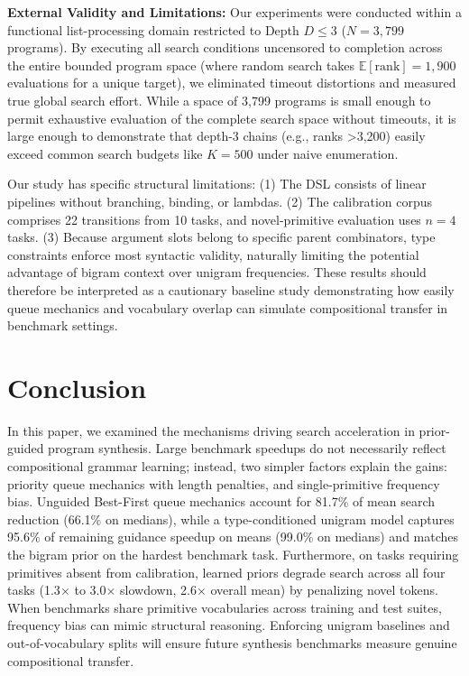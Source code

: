 \documentclass[10pt,twocolumn]{article}
\begin{document}
\textbf{External Validity and Limitations:} Our experiments were conducted within a functional list-processing domain restricted to Depth $D \le 3$ ($N = 3,799$ programs). By executing all search conditions uncensored to completion across the entire bounded program space (where random search takes $\mathbb{E}[\text{rank}] = 1,900$ evaluations for a unique target), we eliminated timeout distortions and measured true global search effort. While a space of 3,799 programs is small enough to permit exhaustive evaluation of the complete search space without timeouts, it is large enough to demonstrate that depth-3 chains (e.g., ranks >3,200) easily exceed common search budgets like $K=500$ under naive enumeration.

Our study has specific structural limitations: (1) The DSL consists of linear pipelines without branching, binding, or lambdas. (2) The calibration corpus comprises 22 transitions from 10 tasks, and novel-primitive evaluation uses $n=4$ tasks. (3) Because argument slots belong to specific parent combinators, type constraints enforce most syntactic validity, naturally limiting the potential advantage of bigram context over unigram frequencies. These results should therefore be interpreted as a cautionary baseline study demonstrating how easily queue mechanics and vocabulary overlap can simulate compositional transfer in benchmark settings.

\section{Conclusion}

In this paper, we examined the mechanisms driving search acceleration in prior-guided program synthesis. Large benchmark speedups do not necessarily reflect compositional grammar learning; instead, two simpler factors explain the gains: priority queue mechanics with length penalties, and single-primitive frequency bias. Unguided Best-First queue mechanics account for 81.7\% of mean search reduction (66.1\% on medians), while a type-conditioned unigram model captures 95.6\% of remaining guidance speedup on means (99.0\% on medians) and matches the bigram prior on the hardest benchmark task. Furthermore, on tasks requiring primitives absent from calibration, learned priors degrade search across all four tasks (1.3$\times$ to 3.0$\times$ slowdown, 2.6$\times$ overall mean) by penalizing novel tokens. When benchmarks share primitive vocabularies across training and test suites, frequency bias can mimic structural reasoning. Enforcing unigram baselines and out-of-vocabulary splits will ensure future synthesis benchmarks measure genuine compositional transfer.
\end{document}
